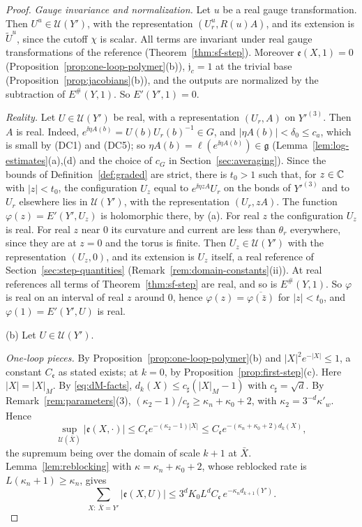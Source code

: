 \begin{proof}
\emph{Gauge invariance and normalization.} Let $u$ be a real gauge transformation. Then $U^u\in\mathcal U(Y')$, with the representation $(U_r^u,R(u)A)$, and its extension is $\tilde U^u$, since the cutoff $\chi$ is scalar. All terms are invariant under real gauge transformations of the reference (Theorem~\ref{thm:sf-step}). Moreover $\mathfrak e(X,1)=0$ (Proposition~\ref{prop:one-loop-polymer}(b)), $\mathfrak j_c=1$ at the trivial base (Proposition~\ref{prop:jacobians}(b)), and the outputs are normalized by the subtraction of $E^\#(Y,1)$. So $E'(Y',1)=0$.

\emph{Reality.} Let $U\in\mathcal U(Y')$ be real, with a representation $(U_r,A)$ on $Y'^{(3)}$. Then $A$ is real. Indeed, $e^{\ii\eta A(b)}=U(b)U_r(b)^{-1}\in G$, and $|\eta A(b)|<\delta_0\le c_a$, which is small by (DC1) and (DC5); so $\eta A(b)=\ell(e^{\ii\eta A(b)})\in\mathfrak g$ (Lemma~\ref{lem:log-estimates}(a),(d) and the choice of $c_G$ in Section~\ref{sec:averaging}). Since the bounds of Definition~\ref{def:graded} are strict, there is $t_0>1$ such that, for $z\in\mathbb C$ with $|z|<t_0$, the configuration $U_z$ equal to $e^{\ii\eta zA}U_r$ on the bonds of $Y'^{(3)}$ and to $U_r$ elsewhere lies in $\mathcal U(Y')$, with the representation $(U_r,zA)$. The function $\varphi(z)=E'(Y',U_z)$ is holomorphic there, by (a). For real $z$ the configuration $U_z$ is real. For real $z$ near $0$ its curvature and current are less than $\theta_r$ everywhere, since they are at $z=0$ and the torus is finite. Then $U_z\in\mathcal U(Y')$ with the representation $(U_z,0)$, and its extension is $U_z$ itself, a real reference of Section~\ref{sec:step-quantities} (Remark~\ref{rem:domain-constants}(ii)). At real references all terms of Theorem~\ref{thm:sf-step} are real, and so is $E^\#(Y,1)$. So $\varphi$ is real on an interval of real $z$ around $0$, hence $\varphi(z)=\overline{\varphi(\bar z)}$ for $|z|<t_0$, and $\varphi(1)=E'(Y',U)$ is real.

(b) Let $U\in\mathcal U(Y')$.

\emph{One-loop pieces.} By Proposition~\ref{prop:one-loop-polymer}(b) and $|X|^2e^{-|X|}\le1$, a constant $C_{\mathfrak e}$ as stated exists; at $k=0$, by Proposition~\ref{prop:first-step}(c). Here $|X|=|X|_M$. By \eqref{eq:dM-facts}, $d_k(X)\le c_\sharp(|X|_M-1)$ with $c_\sharp=\sqrt d$. By Remark~\ref{rem:parameters}(3), $(\kappa_2-1)/c_\sharp\ge\kappa_n+\kappa_0+2$, with $\kappa_2=3^{-d}\kappa'_w$. Hence
\[
\sup_{\mathcal U(\bar X)}|\mathfrak e(X,\cdot)|\le C_{\mathfrak e}e^{-(\kappa_2-1)|X|}\le C_{\mathfrak e}e^{-(\kappa_n+\kappa_0+2)d_k(X)},
\]
the supremum being over the domain of scale $k+1$ at $\bar X$. Lemma~\ref{lem:reblocking} with $\kappa=\kappa_n+\kappa_0+2$, whose reblocked rate is $L(\kappa_n+1)\ge\kappa_n$, gives
\[
\sum_{X:\,\bar X=Y'}|\mathfrak e(X,U)|\le3^dK_0L^dC_{\mathfrak e}\,e^{-\kappa_nd_{k+1}(Y')} .
\]


\end{proof}
